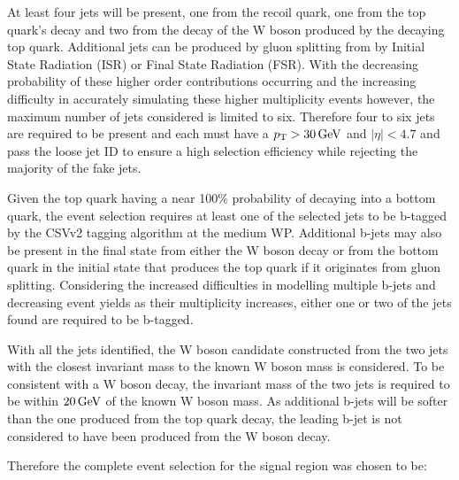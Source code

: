 At least four jets will be present, one from the recoil quark, one from the top quark's decay and two from the decay of the W boson produced by the decaying top quark.
Additional jets can be produced by gluon splitting from by Initial State Radiation (ISR) or Final State Radiation (FSR).
With the decreasing probability of these higher order contributions occurring and the increasing difficulty in accurately simulating these higher multiplicity events however, the maximum number of jets considered is limited to six.
Therefore four to six jets are required to be present and each must have a $p_{\mathrm{T}} > 30\,\text{Ge\hspace{-.08em}V}$ and $|\eta| < 4.7$ and pass the loose jet ID to ensure a high selection efficiency while rejecting the majority of the fake jets.

Given the top quark having a near 100\% probability of decaying into a bottom quark, the event selection requires at least one of the selected jets to be b-tagged by the CSVv2 tagging algorithm at the medium WP.
Additional b-jets may also be present in the final state from either the W boson decay or from the bottom quark in the initial state that produces the top quark if it originates from gluon splitting.
Considering the increased difficulties in modelling multiple b-jets and decreasing event yields as their multiplicity increases, either one or two of the jets found are required to be b-tagged.

With all the jets identified, the W boson candidate constructed from the two jets with the closest invariant mass to the known W boson mass is considered.
To be consistent with a W boson decay, the invariant mass of the two jets is required to be within $20\,\text{Ge\hspace{-.08em}V}$ of the known W boson mass.
As additional b-jets will be softer than the one produced from the top quark decay, the leading b-jet is not considered to have been produced from the W boson decay.


Therefore the complete event selection for the signal region was chosen to be:

